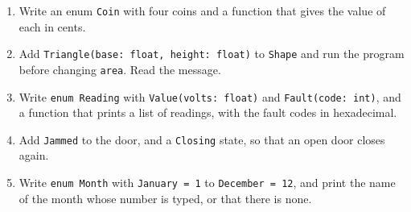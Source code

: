 \begin{tryit}
\begin{enumerate}
\item Write an enum \verb|Coin| with four coins and a function that
  gives the value of each in cents.
\item Add \verb|Triangle(base: float, height: float)| to \verb|Shape|
  and run the program before changing \verb|area|. Read the message.
\item Write \verb|enum Reading| with \verb|Value(volts: float)| and
  \verb|Fault(code: int)|, and a function that prints a list of
  readings, with the fault codes in hexadecimal.
\item Add \verb|Jammed| to the door, and a \verb|Closing| state, so
  that an open door closes again.
\item Write \verb|enum Month| with \verb|January = 1| to
  \verb|December = 12|, and print the name of the month whose number
  is typed, or that there is none.
\end{enumerate}
\end{tryit}
